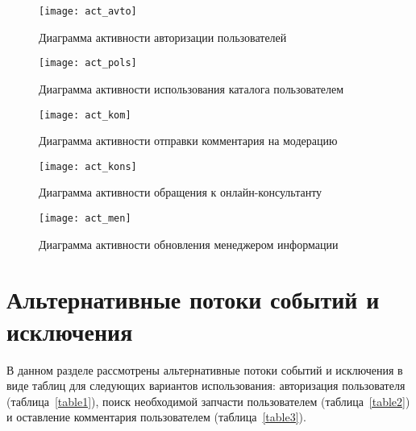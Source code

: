 \documentclass[14pt]{extreport}
\begin{document}
\begin{figure}[H]
\centerline{\texttt{[image: act\_avto]}}
\caption{Диаграмма активности авторизации пользователей}
\label{fig4}
\end{figure}

\begin{figure}[H]
\centerline{\texttt{[image: act\_pols]}}
\caption{Диаграмма активности использования каталога пользователем}
\label{fig5}
\end{figure}

\begin{figure}[H]
\centerline{\texttt{[image: act\_kom]}}
\caption{Диаграмма активности отправки комментария на модерацию}
\label{fig6}
\end{figure}

\begin{figure}[H]
\centerline{\texttt{[image: act\_kons]}}
\caption{Диаграмма активности обращения к онлайн-консультанту}
\label{fig7}
\end{figure}

\begin{figure}[H]
\centerline{\texttt{[image: act\_men]}}
\caption{Диаграмма активности обновления менеджером информации}
\label{fig8}
\end{figure}


\newpage
\section{Альтернативные потоки событий и исключения}

В данном разделе рассмотрены альтернативные потоки событий и исключения в виде таблиц для следующих вариантов использования: авторизация пользователя (таблица~\ref{table1}), поиск необходимой запчасти пользователем (таблица~\ref{table2}) и оставление комментария пользователем (таблица~\ref{table3}).
\end{document}
